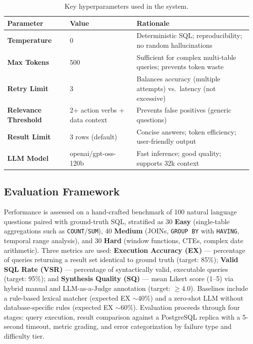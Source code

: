 \documentclass{article}
\begin{document}
\begin{table}[h]
\centering
\small
\begin{tabularx}{\textwidth}{|l|X|X|}
\hline
\textbf{Parameter} & \textbf{Value} & \textbf{Rationale} \\
\hline
\textbf{Temperature} & 0 & Deterministic SQL; reproducibility; no random hallucinations \\
\hline
\textbf{Max Tokens} & 500 & Sufficient for complex multi-table queries; prevents token waste \\
\hline
\textbf{Retry Limit} & 3 & Balances accuracy (multiple attempts) vs.\ latency (not excessive) \\
\hline
\textbf{Relevance Threshold} & 2+ action verbs + data context & Prevents false positives (generic questions) \\
\hline
\textbf{Result Limit} & 3 rows (default) & Concise answers; token efficiency; user-friendly output \\
\hline
\textbf{LLM Model} & openai/gpt-oss-120b & Fast inference; good quality; supports 32k context \\
\hline
\end{tabularx}
\caption{Key hyperparameters used in the system.}
\label{tab:hyperparameters}
\end{table}

\subsection{Evaluation Framework}

Performance is assessed on a hand-crafted benchmark of 100 natural language questions paired with ground-truth SQL, stratified as 30 \textbf{Easy} (single-table aggregations such as \texttt{COUNT}/\texttt{SUM}), 40 \textbf{Medium} (JOINs, \texttt{GROUP BY} with \texttt{HAVING}, temporal range analysis), and 30 \textbf{Hard} (window functions, CTEs, complex date arithmetic). Three metrics are used: \textbf{Execution Accuracy (EX)} --- percentage of queries returning a result set identical to ground truth (target: 85\%); \textbf{Valid SQL Rate (VSR)} --- percentage of syntactically valid, executable queries (target: 95\%); and \textbf{Synthesis Quality (SQ)} --- mean Likert score (1--5) via hybrid manual and LLM-as-a-Judge annotation (target: $\geq$4.0). Baselines include a rule-based lexical matcher (expected EX $\sim$40\%) and a zero-shot LLM without database-specific rules (expected EX $\sim$60\%). Evaluation proceeds through four stages: query execution, result comparison against a PostgreSQL replica with a 5-second timeout, metric grading, and error categorization by failure type and difficulty tier.
\end{document}
